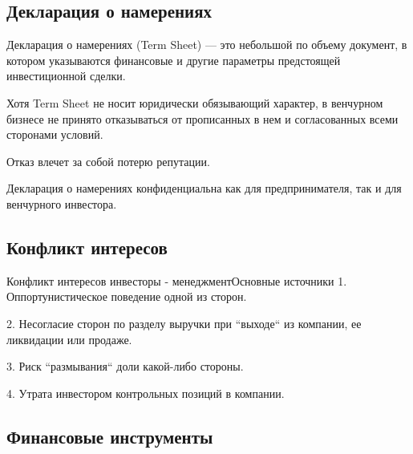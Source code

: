 \documentclass[_Venture_p2.tex]{subfiles}
\begin{document}

\subsection{Декларация о намерениях}
\begin{frame}[shrink=5]{}
\begin{block}{Декларация о намерениях (Term Sheet)}
\quad
— это небольшой по объему документ, в котором указываются финансовые и другие параметры предстоящей инвестиционной сделки.
\end{block}
Хотя Term Sheet не носит юридически обязывающий характер, в венчурном бизнесе не принято отказываться от прописанных в нем и согласованных всеми сторонами условий. 

Отказ влечет за собой потерю репутации. 

Декларация о намерениях конфиденциальна как для предпринимателя, так и для венчурного инвестора.
\end{frame}

\subsection{Конфликт интересов}	
\begin{frame}{Конфликт интересов инвесторы - менеджмент}{Основные источники}
1.	Оппортунистическое поведение одной из сторон.

2.	Несогласие сторон по разделу выручки при ``выходе`` из компании, ее ликвидации или продаже. 

3.	Риск ``размывания`` доли какой-либо стороны.

4. Утрата инвестором контрольных позиций в компании.

\end{frame}

\subsection{Финансовые инструменты}
\end{document}

